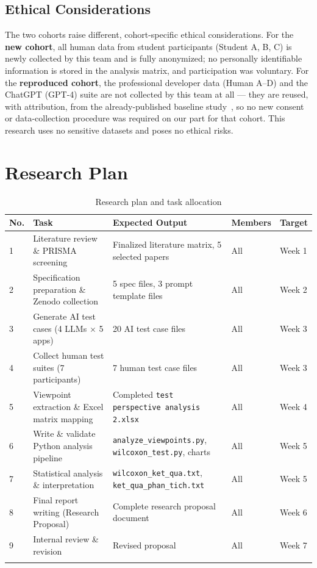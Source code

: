 \documentclass[12pt,a4paper]{article}
\begin{document}
\subsection{Ethical Considerations}
The two cohorts raise different, cohort-specific ethical considerations. For the \textbf{new cohort}, all human data from student participants (Student A, B, C) is newly collected by this team and is fully anonymized; no personally identifiable information is stored in the analysis matrix, and participation was voluntary. For the \textbf{reproduced cohort}, the professional developer data (Human A--D) and the ChatGPT (GPT-4) suite are not collected by this team at all --- they are reused, with attribution, from the already-published baseline study~\cite{b1}, so no new consent or data-collection procedure was required on our part for that cohort. This research uses no sensitive datasets and poses no ethical risks.

\section{Research Plan}
\begin{longtable}{p{0.6cm} p{4.3cm} p{4.3cm} p{2.2cm} p{1.8cm}}
\toprule
\textbf{No.} & \textbf{Task} & \textbf{Expected Output} & \textbf{Members} & \textbf{Target} \\
\midrule
\endhead
1 & Literature review \& PRISMA screening & Finalized literature matrix, 5 selected papers & All & Week 1 \\
2 & Specification preparation \& Zenodo collection & 5 spec files, 3 prompt template files & All & Week 2 \\
3 & Generate AI test cases (4 LLMs $\times$ 5 apps) & 20 AI test case files & All & Week 3 \\
4 & Collect human test suites (7 participants) & 7 human test case files & All & Week 3 \\
5 & Viewpoint extraction \& Excel matrix mapping & Completed \texttt{test perspective analysis 2.xlsx} & All & Week 4 \\
6 & Write \& validate Python analysis pipeline & \texttt{analyze\_viewpoints.py}, \texttt{wilcoxon\_test.py}, charts & All & Week 5 \\
7 & Statistical analysis \& interpretation & \texttt{wilcoxon\_ket\_qua.txt}, \texttt{ket\_qua\_phan\_tich.txt} & All & Week 5 \\
8 & Final report writing (Research Proposal) & Complete research proposal document & All & Week 6 \\
9 & Internal review \& revision & Revised proposal & All & Week 7 \\
\bottomrule
\caption{Research plan and task allocation}
\label{tab:plan}
\end{longtable}
\end{document}
